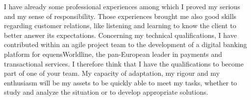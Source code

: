 \documentclass[11pt, a4paper]{awesome-cv}
\begin{document}
\begin{cvletter}
\vspace{1mm} 

I have already some professional experiences among which I proved my serious and my sense of responsibility. Those experiences brought me also good skills regarding customer relations, like listening and learning to know the client to better answer its expectations. Concerning my technical qualifications, I have contributed within an agile project team to the development of a digital banking platform for equensWorldline, the pan-European leader in payments and transactional services. I therefore think that I have the qualifications to become part of one of your team. My capacity of adaptation, my rigour and my enthusiasm will be my assets to be quickly able to meet my tasks, whether to study and analyze the situation or to develop appropriate solutions. 




\end{cvletter}


\makeletterclosing
\end{document}
